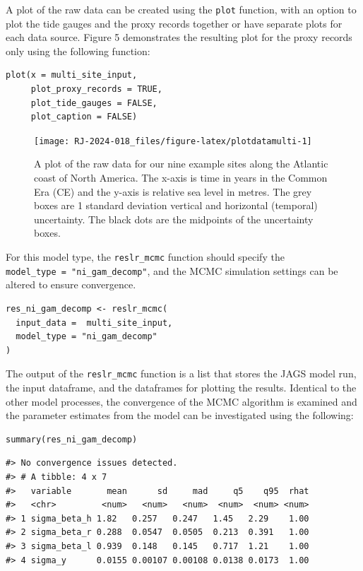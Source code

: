 \normalsize

A plot of the raw data can be created using the \texttt{plot} function, with an option to plot the tide gauges and the proxy records together or have separate plots for each data source. Figure 5 demonstrates the resulting plot for the proxy records only using the following function:
\scriptsize

\begin{verbatim}
plot(x = multi_site_input,
     plot_proxy_records = TRUE,
     plot_tide_gauges = FALSE,
     plot_caption = FALSE)
\end{verbatim}

\begin{figure}

{\centering \texttt{[image: RJ-2024-018\_files/figure-latex/plotdatamulti-1]} 

}

\caption{A plot of the raw data for our nine example sites along the Atlantic coast of North America. The x-axis is time in years in the Common Era (CE) and the y-axis is relative sea level in metres. The grey boxes are 1 standard deviation vertical and horizontal (temporal) uncertainty. The black dots are the midpoints of the uncertainty boxes.}\label{fig:plotdatamulti}
\end{figure}
\normalsize

For this model type, the \texttt{reslr\_mcmc} function should specify the \texttt{model\_type\ =\ "ni\_gam\_decomp"}, and the MCMC simulation settings can be altered to ensure convergence.
\scriptsize

\begin{verbatim}
res_ni_gam_decomp <- reslr_mcmc(
  input_data =  multi_site_input,
  model_type = "ni_gam_decomp"
)
\end{verbatim}

\normalsize

The output of the \texttt{reslr\_mcmc} function is a list that stores the JAGS model run, the input dataframe, and the dataframes for plotting the results. Identical to the other model processes, the convergence of the MCMC algorithm is examined and the parameter estimates from the model can be investigated using the following:
\scriptsize

\begin{verbatim}
summary(res_ni_gam_decomp)
\end{verbatim}

\begin{verbatim}
#> No convergence issues detected.
#> # A tibble: 4 x 7
#>   variable       mean      sd     mad     q5    q95  rhat
#>   <chr>         <num>   <num>   <num>  <num>  <num> <num>
#> 1 sigma_beta_h 1.82   0.257   0.247   1.45   2.29    1.00
#> 2 sigma_beta_r 0.288  0.0547  0.0505  0.213  0.391   1.00
#> 3 sigma_beta_l 0.939  0.148   0.145   0.717  1.21    1.00
#> 4 sigma_y      0.0155 0.00107 0.00108 0.0138 0.0173  1.00
\end{verbatim}

